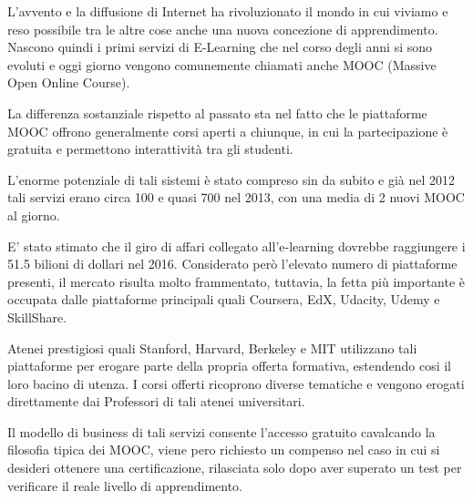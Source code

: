 L'avvento e la diffusione di Internet ha rivoluzionato il mondo in cui viviamo e reso possibile tra le altre cose anche una nuova concezione di apprendimento. Nascono quindi i primi servizi di E-Learning che nel corso degli anni si sono evoluti e oggi giorno vengono comunemente chiamati anche MOOC (Massive Open Online Course).

La differenza sostanziale rispetto al passato sta nel fatto che le piattaforme MOOC offrono generalmente corsi aperti a chiunque, in cui la partecipazione è gratuita e permettono interattività tra gli studenti.

L'enorme potenziale di tali sistemi è stato compreso sin da subito e già nel 2012 tali servizi erano circa 100 e quasi 700 nel 2013, con una media di 2 nuovi MOOC al giorno.


E' stato stimato che il giro di affari collegato all'e-learning dovrebbe raggiungere i 51.5 bilioni di dollari nel 2016\cite{trends2014forecast}. Considerato però l'elevato numero di piattaforme presenti, il mercato risulta molto frammentato, tuttavia, la fetta più importante è occupata dalle piattaforme principali quali Coursera, EdX, Udacity, Udemy e SkillShare.




Atenei prestigiosi quali Stanford, Harvard, Berkeley e MIT utilizzano tali piattaforme per erogare parte della propria offerta formativa, estendendo cosi il loro bacino di utenza.
I corsi offerti ricoprono diverse tematiche e vengono erogati direttamente dai Professori di tali atenei universitari.

Il modello di business di tali servizi consente l'accesso gratuito cavalcando la filosofia tipica dei MOOC, viene pero richiesto un compenso nel caso in cui si desideri ottenere una certificazione, rilasciata solo dopo aver superato un test per verificare il reale livello di apprendimento.

